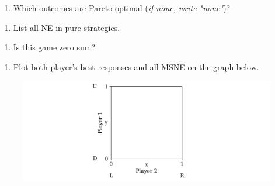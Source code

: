 \documentclass[11pt]{article}
\begin{document}
\begin{enumerate}[label=\alph*), start=1]
\item  Which outcomes are Pareto optimal (\textit{if none, write "none"})? \hfill \raisebox{-1ex}{\rule{4.2cm}{1pt}}

\end{enumerate}
\begin{enumerate}[label=\alph*), start=2]
\item  List all NE in pure strategies. \hfill \raisebox{-1ex}{\rule{4.2cm}{1pt}}

\end{enumerate}
\begin{enumerate}[label=\alph*), start=3]
\item  Is this game zero sum? \hfill \raisebox{-1ex}{\rule{4.2cm}{1pt}}

\end{enumerate}
\begin{enumerate}[label=\alph*), start=4]
\item  Plot both player’s best responses and all MSNE on the graph below.

\end{enumerate}


\begin{figure}[h!]
\centering
\includegraphics[width=\textwidth]{Images/mixed_strategy_graph.png}
\end{figure}
\end{document}
